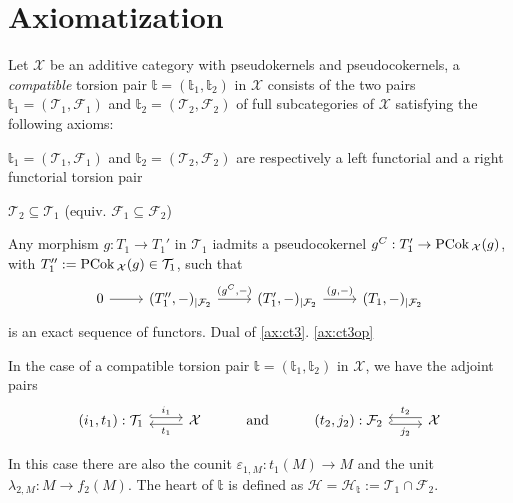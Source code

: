 \clearpage

\section{Axiomatization}

\begin{definition}
  Let $\mathcal{X}$ be an additive category with pseudokernels and pseudocokernels, a \emph{compatible}
  torsion pair $\mathbb{t}=(\mathbb{t}_1,\mathbb{t}_2)$ in $\mathcal{X}$ consists of the two pairs
  $\mathbb{t}_1=(\mathcal{T}_1,\mathcal{F}_1)$ and $\mathbb{t}_2=(\mathcal{T}_2,\mathcal{F}_2)$ of full subcategories
  of $\mathcal{X}$ satisfying the following axioms:

  \begin{torsionaxioms}
    \item\label{ax:ct1} $\mathbb{t}_1=(\mathcal{T}_1,\mathcal{F}_1)$ and $\mathbb{t}_2=(\mathcal{T}_2,\mathcal{F}_2)$ are respectively a left functorial and a
    right functorial torsion pair
    \item\label{ax:ct2} $\mathcal{T}_2\subseteq \mathcal{T}_1$ (equiv. $\mathcal{F}_1\subseteq\mathcal{F}_2$)
    \item\label{ax:ct3} Any morphism $g:T_1\to T_1'$ in $\mathcal{T}_1$ iadmits a pseudocokernel $g^C:T_1'\to\mathrm{\textup{PCok\,}}_\mathcal{X}(g)$,
    with $T_1'':=\mathrm{\textup{PCok\,}}_\mathcal{X}(g)\in\mathcal{T}_1$, such that
    \begin{equation*}
      \begin{tikzcd}
        0\arrow{r} &(T_1'',-)_{|\mathcal{F}_2}\arrow{r}{(g^C,-)}
        & (T_1',-)_{|\mathcal{F}_2}\arrow{r}{(g,-)}& (T_1,-)_{|\mathcal{F}_2}
      \end{tikzcd}
    \end{equation*}
    is an exact sequence of functors.
    \varitem{^\ast}\label{ax:ct3op} Dual of \ref{ax:ct3}. \ref{ax:ct3op}
  \end{torsionaxioms}
\end{definition}

\begin{notation}
  In the case of a compatible torsion pair $\mathbb{t}=(\mathbb{t}_1,\mathbb{t}_2)$ in $\mathcal{X}$,
  we have the adjoint pairs
  \begin{equation*}
    \begin{tikzcd}
      (i_1,t_1):\mathcal{T}_1\arrow[hook, shift left]{r}{i_1}
        & \mathcal{X}\arrow[shift left]{l}{t_1}
        & \mathrm{and}
        & (t_2,j_2):\mathcal{F}_2\arrow[hook, shift right]{r}[']{j_2}
          & \mathcal{X}\arrow[shift right]{l}[']{t_2}
    \end{tikzcd}
  \end{equation*}

  In this case there are also the counit $\varepsilon_{1,M}:t_1(M)\to M$ and the
  unit $\lambda_{2,M}:M\to f_2(M)$. The heart of $\mathbb{t}$ is defined as
  $\mathcal{H}=\mathcal{H}_\mathbb{t}:=\mathcal{T}_1\cap\mathcal{F}_2$.
\end{notation}

